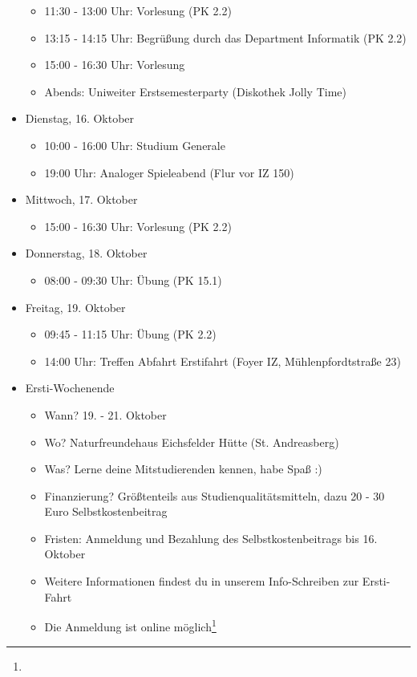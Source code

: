\begin{itemize}
\begin{itemize}
            \item 11:30 - 13:00 Uhr: Vorlesung  (PK 2.2)
            \item 13:15 - 14:15 Uhr: Begrüßung durch das Department Informatik (PK 2.2)
            \item 15:00 - 16:30 Uhr: Vorlesung 
            \item Abends: Uniweiter Erstsemesterparty (Diskothek Jolly Time)
        \end{itemize}
    \item Dienstag, 16. Oktober
        \begin{itemize}
            \item 10:00 - 16:00 Uhr: Studium Generale 
            \item 19:00 Uhr: Analoger Spieleabend (Flur vor IZ 150)
        \end{itemize}
    \item Mittwoch, 17. Oktober
        \begin{itemize}
            \item 15:00 - 16:30 Uhr: Vorlesung  (PK 2.2)
        \end{itemize}
    \item Donnerstag, 18. Oktober
        \begin{itemize}
            \item 08:00 - 09:30 Uhr: Übung  (PK 15.1)
        \end{itemize}
    \item Freitag, 19. Oktober
        \begin{itemize}
            \item 09:45 - 11:15 Uhr: Übung  (PK 2.2)
            \item 14:00 Uhr: Treffen Abfahrt Erstifahrt (Foyer IZ, Mühlenpfordtstraße 23)
        \end{itemize}
    \item Ersti-Wochenende
        \begin{itemize}
            \item Wann? 19. - 21. Oktober
            \item Wo? Naturfreundehaus Eichsfelder Hütte (St. Andreasberg)
            \item Was? Lerne deine Mitstudierenden kennen, habe Spaß :)
            \item Finanzierung? Größtenteils aus Studienqualitätsmitteln, dazu 20 - 30 Euro Selbstkostenbeitrag
            \item Fristen: Anmeldung und Bezahlung des Selbstkostenbeitrags bis 16. Oktober
            \item Weitere Informationen findest du in unserem Info-Schreiben zur Ersti-Fahrt
            \item Die Anmeldung ist online möglich\footnote{}
        \end{itemize}
\end{itemize}
